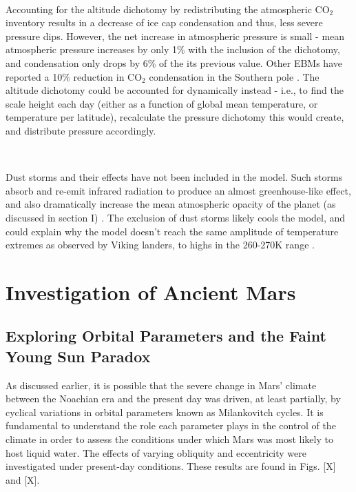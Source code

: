 \documentclass[12pt,onecolumn]{revtex4-2}    %
\begin{document}
\

Accounting for the altitude dichotomy by redistributing the atmospheric $\mathrm{CO_2}$ inventory results in a decrease of ice cap condensation and thus, less severe pressure dips. However, the net increase in atmospheric pressure is small - mean atmospheric pressure increases by only 1\% with the inclusion of the dichotomy, and condensation only drops by 6\% of the its previous value. Other EBMs have reported a 10\% reduction in $\mathrm{CO_2}$ condensation in the Southern pole \cite{JN82}. The altitude dichotomy could be accounted for dynamically instead - i.e., to find the scale height each day (either as a function of global mean temperature, or temperature per latitude), recalculate the pressure dichotomy this would create, and distribute pressure accordingly. 

\

Dust storms and their effects have not been included in the model. Such storms absorb and re-emit infrared radiation to produce an almost greenhouse-like effect, and also dramatically increase the mean atmospheric opacity of the planet (as discussed in section I) \cite{WR15}. The exclusion of dust storms likely cools the model, and could explain why the model doesn't reach the same amplitude of temperature extremes as observed by Viking landers, to highs in the 260-270K range \cite{K76}.

\section{Investigation of Ancient Mars}
\subsection{Exploring Orbital Parameters and the Faint Young Sun Paradox}

As discussed earlier, it is possible that the severe change in Mars' climate between the Noachian era and the present day was driven, at least partially, by cyclical variations in orbital parameters known as Milankovitch cycles. It is fundamental to understand the role each parameter plays in the control of the climate in order to assess the conditions under which Mars was most likely to host liquid water. The effects of varying obliquity and eccentricity were investigated under present-day conditions. These results are found in Figs. [X] and [X].
\\
\end{document}
